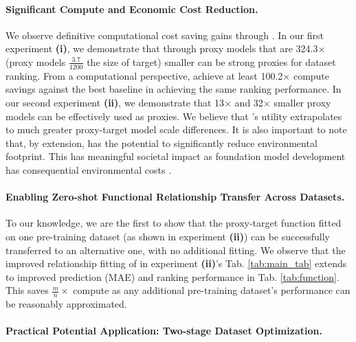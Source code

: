 \paragraph{Significant Compute and Economic Cost Reduction.} We observe definitive computational cost saving gains through . In our first experiment \textbf{(i)}, we demonstrate that through  proxy models that are 324.3$\times$ (proxy models $\frac{3.7}{1200}$ the size of target) smaller can be strong proxies for dataset ranking. From a computational perspective,  achieve at least 100.2$\times$ compute savings against the best baseline in achieving the same ranking performance. In our second experiment \textbf{(ii)}, we demonstrate that 13$\times$ and 32$\times$ smaller proxy models can be effectively used as proxies. We believe that 's utility extrapolates to much greater proxy-target model scale differences. It is also important to note that, by extension,  has the potential to significantly reduce environmental footprint. This has meaningful societal impact as foundation model development has consequential environmental costs \citep{winsta2025hidden,morrison2025holistically}.


\paragraph{Enabling Zero-shot Functional Relationship Transfer Across Datasets.} To our knowledge, we are the first to show that the proxy-target function fitted on one pre-training dataset (as shown in experiment \textbf{(ii)}) can be successfully transferred to an alternative one, with no additional fitting. We observe that the improved relationship fitting of  in experiment \textbf{(ii)}'s Tab. \ref{tab:main_tab} extends to improved prediction (MAE) and ranking performance in Tab. \ref{tab:function}. This saves $\frac{m}{n}\times$ compute as any additional pre-training dataset's performance can be reasonably approximated.

\paragraph{Practical Potential Application: Two-stage Dataset Optimization.} 

